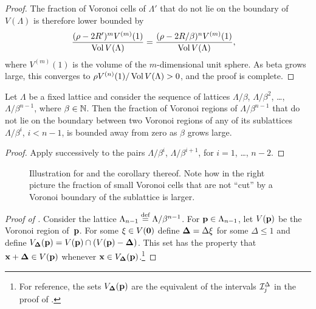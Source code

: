 \begin{subappendices}
\begin{proof}
    The fraction of Voronoi cells of $\Lambda'$ that do not lie on the boundary
    of $V(\Lambda)$ is therefore lower bounded by
    \begin{align*}
      \frac{(\rho - 2R')^m V^{(m)}(1)}{\operatorname{Vol} V(\Lambda)} &= \frac{(\rho -
      2R/\beta)^n V^{(m)}(1)}{\operatorname{Vol} V(\Lambda)},
    \end{align*}
    where $V^{(m)}(1)$ is the volume of the $m$-dimensional unit sphere. As beta
    grows large, this converges to $\rho V^{(n)}(1) / \operatorname{Vol} V(\Lambda) > 0$, and
    the proof is complete.
  \end{proof}

  \begin{corollary}
    Let $\Lambda$ be a fixed lattice and consider the sequence of lattices
    $\Lambda/\beta$, $\Lambda/\beta^2$, \dots, $\Lambda/\beta^{n-1}$, where
    $\beta \in {\mathbb{N}}$. Then the fraction of Voronoi regions of
    $\Lambda/\beta^{n-1}$ that do not lie on the boundary between two Voronoi
    regions of any of its sublattices $\Lambda/\beta^i$, $i < n-1$, is bounded
    away from zero as $\beta$ grows large.
  \end{corollary}

  \begin{proof}
    Apply  successively to the pairs $\Lambda/\beta^i$,
    $\Lambda/\beta^{i+1}$, for $i = 1$, \dots, $n-2$.
  \end{proof}

  \begin{figure}[tbp]
    \centerline{
    \subfloat[$\beta = 3$]{}
    \hfil
    \subfloat[$\beta = 4$]{}
    }
    \caption{Illustration for  and the corollary thereof.
    Note how in the right picture the fraction of small Voronoi cells that are
    not ``cut'' by a Voronoi boundary of the sublattice is larger.}
    \label{fig:voronoiintersect}
  \end{figure}

  \begin{proof}[Proof of ]
    Consider the lattice ${\Lambda_{n-1}} \stackrel{\text{def}}{=} \Lambda/\beta^{n-1}$. For $\mathbf{p} \in
    {\Lambda_{n-1}}$, let $V(\mathbf{p})$ be the Voronoi region of~$\mathbf{p}$.
    For some $\mathbf{\xi} \in V(\mathbf{0})$ define $\mathbf{\Delta} = \Delta \mathbf{\xi}$ for some $\Delta \le
    1$ and define ${V_{\mathbf{\Delta}}}(\mathbf{p}) = V(\mathbf{p}) \cap (V(\mathbf{p}) - \mathbf{\Delta})$. This set has the
    property that $\mathbf{x} + \mathbf{\Delta} \in V(\mathbf{p})$ whenever $\mathbf{x} \in {V_{\mathbf{\Delta}}}(\mathbf{p})$.\footnote{For
    reference, the sets ${V_{\mathbf{\Delta}}}(\mathbf{p})$ are the equivalent of the intervals
    $\mathcal{I}_j^{\Delta}$ in the proof of .}


\end{proof}
\end{subappendices}
